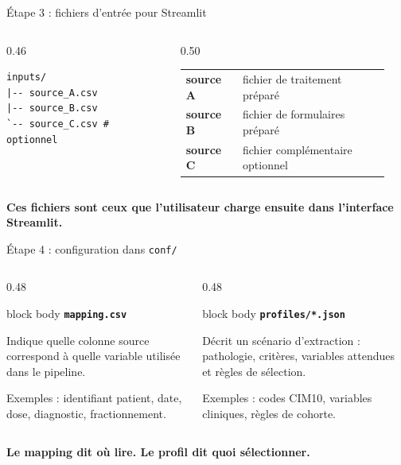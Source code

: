 \documentclass[10pt,aspectratio=169]{beamer}
\newenvironment{infobox}[1]
{\begin{beamercolorbox}[rounded=true,shadow=false,wd=\linewidth,sep=0.8em]{block body}
\textbf{\color{DarkBlue}#1}\par\vspace{0.3em}}
{\end{beamercolorbox}}
\begin{document}
\begin{frame}[fragile]{Étape 3 : fichiers d'entrée pour Streamlit}
\begin{columns}[T,onlytextwidth]
\begin{column}{0.46\linewidth}
\begin{lstlisting}
inputs/
|-- source_A.csv
|-- source_B.csv
`-- source_C.csv # optionnel
\end{lstlisting}
\end{column}

\begin{column}{0.50\linewidth}
\begin{tabular}{>{\bfseries}p{0.25\linewidth} p{0.65\linewidth}}
source A & fichier de traitement préparé\\
source B & fichier de formulaires préparé\\
source C & fichier complémentaire optionnel\\
\end{tabular}
\end{column}
\end{columns}

\vfill
\centering
\textbf{Ces fichiers sont ceux que l'utilisateur charge ensuite dans l'interface Streamlit.}
\end{frame}

\begin{frame}{Étape 4 : configuration dans \texttt{conf/}}
\begin{columns}[T,onlytextwidth]
\begin{column}{0.48\linewidth}
\begin{infobox}{\texttt{mapping.csv}}
Indique quelle colonne source correspond à quelle variable utilisée dans le pipeline.

\vspace{0.4em}
Exemples : identifiant patient, date, dose, diagnostic, fractionnement.
\end{infobox}
\end{column}

\begin{column}{0.48\linewidth}
\begin{infobox}{\texttt{profiles/*.json}}
Décrit un scénario d'extraction : pathologie, critères, variables attendues et règles de sélection.

\vspace{0.4em}
Exemples : codes CIM10, variables cliniques, règles de cohorte.
\end{infobox}
\end{column}
\end{columns}

\vfill
\centering
\textbf{Le mapping dit où lire. Le profil dit quoi sélectionner.}
\end{frame}
\end{document}
